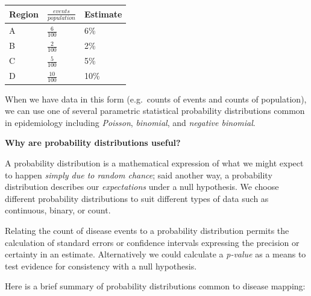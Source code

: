 \documentclass[
]{book}
\newenvironment{rmdnote}[1]
  {
  \begin{itemize}
  \renewcommand{\labelitemi}{
    \raisebox{-.7\height}[0pt][0pt]{
      {\setkeys{Gin}{width=3em,keepaspectratio}\texttt{[image: images/\#1]}}
    }
  }
  \setlength{\fboxsep}{1em}
  \begin{note}
  \item
  }
  {
  \end{note}
  \end{itemize}
  }
\begin{document}
\begin{longtable}[]{@{}lll@{}}
\toprule\noalign{}
Region & \(\frac{events}{population}\) & Estimate \\
\midrule\noalign{}
\endhead
\bottomrule\noalign{}
\endlastfoot
A & \(\frac{6}{100}\) & 6\% \\
B & \(\frac{2}{100}\) & 2\% \\
C & \(\frac{5}{100}\) & 5\% \\
D & \(\frac{10}{100}\) & 10\% \\
\end{longtable}

When we have data in this form (e.g.~counts of events and counts of population), we can use one of several parametric statistical probability distributions common in epidemiology including \emph{Poisson}, \emph{binomial}, and \emph{negative binomial}.

\begin{rmdnote}{note}
\textbf{Why are probability distributions useful?}

A probability distribution is a mathematical expression of what we might expect to happen \emph{simply due to random chance}; said another way, a probability distribution describes our \emph{expectations} under a null hypothesis. We choose different probability distributions to suit different types of data such as continuous, binary, or count.

Relating the count of disease events to a probability distribution permits the calculation of standard errors or confidence intervals expressing the precision or certainty in an estimate. Alternatively we could calculate a \emph{p-value} as a means to test evidence for consistency with a null hypothesis.

\end{rmdnote}

Here is a brief summary of probability distributions common to disease mapping:
\end{document}
